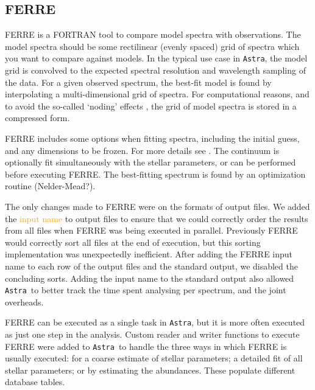 \documentclass[modern]{aastex631}
\newcommand{\astra}{\texttt{Astra}}
\newcommand{\todo}[1]{\textcolor{orange}{#1}}
\begin{document}
\subsection{FERRE} \label{sec:methods-ferre}

FERRE \citep[or FERRE]{ferre} %
is a FORTRAN tool to compare model spectra with observations.
The model spectra should be some rectilinear (evenly spaced) grid of spectra which you want to compare against models.
In the typical use case in \astra, the model grid is convolved to the expected spectral resolution and wavelength sampling of the data.
For a given observed spectrum, the best-fit model is found by interpolating a multi-dimensional grid of spectra.
For computational reasons, and to avoid the so-called `noding' effects \citep{CITE}, the grid of model spectra is stored in a compressed form.

FERRE includes some options when fitting spectra, including the initial guess, and any dimensions to be frozen. For more details see \citet{CITE}.
The continuum is optionally fit simultaneously with the stellar parameters, or can be performed before executing FERRE.
The best-fitting spectrum is found by an optimization routine (Nelder-Mead?).

The only changes made to FERRE were on the formats of output files. We added the \todo{input name} to output files to ensure that we could correctly order the results from all files when FERRE was being executed in parallel. 
Previously FERRE would correctly sort all files at the end of execution, but this sorting implementation was unexpectedly inefficient. 
After adding the FERRE input name to each row of the output files and the standard output, we disabled the concluding sorts.
Adding the input name to the standard output also allowed \astra\ to better track the time spent analysing per spectrum, and the joint overheads.

FERRE can be executed as a single task in \astra, but it is more often executed as just one step in the analysis.
Custom reader and writer functions to execute FERRE were added to \astra\ to handle the three ways in which FERRE is usually executed: for a coarse estimate of stellar parameters; a detailed fit of all stellar parameters; or by estimating the abundances. These populate different database tables. 
\end{document}
